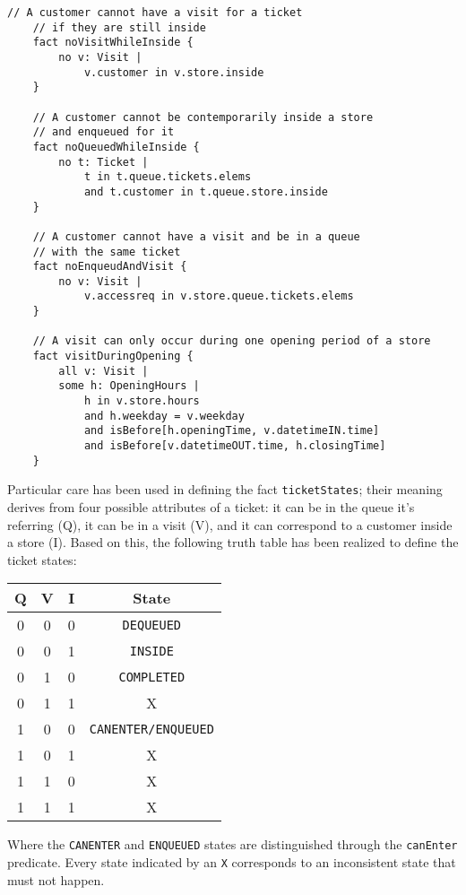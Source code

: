 \begin{lstlisting}[language=alloy]
	// A customer cannot have a visit for a ticket 
	// if they are still inside
	fact noVisitWhileInside {
		no v: Visit |
			v.customer in v.store.inside
	}
	
	// A customer cannot be contemporarily inside a store 
	// and enqueued for it
	fact noQueuedWhileInside {
		no t: Ticket |
			t in t.queue.tickets.elems 
			and t.customer in t.queue.store.inside
	}
	
	// A customer cannot have a visit and be in a queue
	// with the same ticket
	fact noEnqueudAndVisit {
		no v: Visit |
			v.accessreq in v.store.queue.tickets.elems
	}
	
	// A visit can only occur during one opening period of a store
	fact visitDuringOpening { 
		all v: Visit | 
		some h: OpeningHours | 
			h in v.store.hours 
			and h.weekday = v.weekday
			and isBefore[h.openingTime, v.datetimeIN.time]
			and isBefore[v.datetimeOUT.time, h.closingTime]
	}
\end{lstlisting}

Particular care has been used in defining the fact \texttt{ticketStates}; their meaning derives from four possible attributes of a ticket: it can be in the queue it's referring (Q), it can be in a visit (V), and it can correspond to a customer inside a store (I). Based on this, the following truth table has been realized to define the ticket states: 

\begin{center}
	\begin{tabular}{c c c | c}
		Q & V & I & State \\
		\hline
		0 & 0 & 0 & \texttt{DEQUEUED} \\
		0 & 0 & 1 & \texttt{INSIDE} \\
		0 & 1 & 0 & \texttt{COMPLETED} \\
		0 & 1 & 1 & X \\
		1 & 0 & 0 & \texttt{CANENTER/ENQUEUED} \\
		1 & 0 & 1 & X \\
		1 & 1 & 0 & X \\
		1 & 1 & 1 & X \\
	\end{tabular}
\end{center}
Where the \texttt{CANENTER} and \texttt{ENQUEUED} states are distinguished through the \texttt{canEnter} predicate. Every state indicated by an \texttt{X} corresponds to an inconsistent state that must not happen.